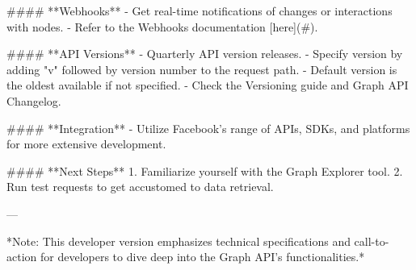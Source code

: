 #### **Webhooks**
- Get real-time notifications of changes or interactions with nodes.
- Refer to the Webhooks documentation [here](#).

#### **API Versions**
- Quarterly API version releases.
- Specify version by adding "v" followed by version number to the request path.
- Default version is the oldest available if not specified.
- Check the Versioning guide and Graph API Changelog.

#### **Integration**
- Utilize Facebook's range of APIs, SDKs, and platforms for more extensive development.

#### **Next Steps**
1. Familiarize yourself with the Graph Explorer tool.
2. Run test requests to get accustomed to data retrieval.

---

*Note: This developer version emphasizes technical specifications and call-to-action for developers to dive deep into the Graph API's functionalities.*